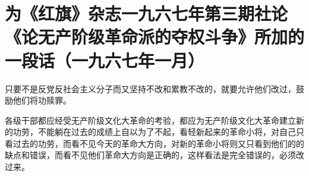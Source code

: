 \section[为《红旗》杂志一九六七年第三期社论《论无产阶级革命派的夺权斗争》所加的一段话（一九六七年一月）]{为《红旗》杂志一九六七年第三期社论《论无产阶级革命派的夺权斗争》所加的一段话（一九六七年一月）}


只要不是反党反社会主义分子而又坚持不改和累教不改的，就要允许他们改过，鼓励他们将功赎罪。

各级干部都应经受无产阶级文化大革命的考验，都应为无产阶级文化大革命建立新的功劳，不能躺在过去的成绩上自以为了不起，看轻新起来的革命小将，对自己只看过去的功劳，而看不见今天的革命大方向，对新的革命小将则又只看到他们的的缺点和错误，而看不见他们革命大方向是正确的，这样看法是完全错误的，必须改过来。

